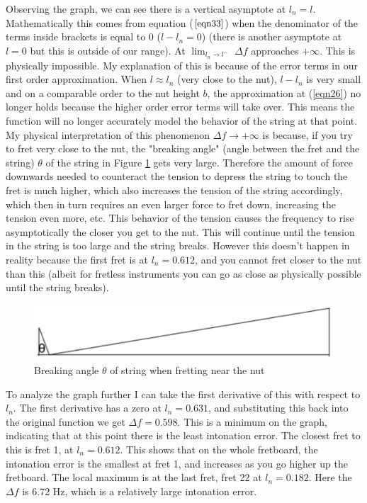\documentclass[11pt]{article}
\begin{document}
\begin{flushleft}
                Observing the graph, we can see there is a vertical asymptote at $l_n = l$. Mathematically this comes from equation ($\ref{eqn33}$) when the denominator of the terms inside brackets is equal to 0 ($l-l_n = 0$) (there is another asymptote at $l=0$ but this is outside of our range). At $\lim_{l_n \to l^-}$ $\Delta f$ approaches $+\infty$. This is physically impossible. My explanation of this is because of the error terms in our first order approximation. When $l \approx l_n$ (very close to the nut), $l-l_n$ is very small and on a comparable order to the nut height $b$, the approximation at (\ref{eqn26}) no longer holds because the higher order error terms will take over. This means the function will no longer accurately model the behavior of the string at that point. My physical interpretation of this phenomenon $\Delta f \to +\infty $ is because, if you try to fret very close to the nut, the "breaking angle" (angle between the fret and the string) $\theta$ of the string in Figure \ref{fig9} gets very large. Therefore the amount of force downwards needed to counteract the tension to depress the string to touch the fret is much higher, which also increases the tension of the string accordingly, which then in turn requires an even larger force to fret down, increasing the tension even more, etc. This behavior of the tension causes the frequency to rise asymptotically the closer you get to the nut. This will continue until the tension in the string is too large and the string breaks. However this doesn't happen in reality because the first fret is at $l_n = 0.612$, and you cannot fret closer to the nut than this (albeit for fretless instruments you can go as close as physically possible until the string breaks). \par
                \begin{figure}[!htb]
                    \includegraphics[width=\textwidth]{breaking_angles.png}
                    \caption{Breaking angle $\theta$ of string when fretting near the nut} \label{fig9}
                \end{figure}
                To analyze the graph further I can take the first derivative of this with respect to $l_n$. The first derivative has a zero at $l_n = 0.631$, and substituting this back into the original function we get $\Delta f = 0.598$. This is a minimum on the graph, indicating that at this point there is the least intonation error. The closest fret to this is fret 1, at $l_n = 0.612$. This shows that on the whole fretboard, the intonation error is the smallest at fret 1, and increases as you go higher up the fretboard. The local maximum is at the last fret, fret 22 at $l_n = 0.182$. Here the $\Delta f$ is 6.72 Hz, which is a relatively large intonation error. \par

\end{flushleft}
\end{document}
